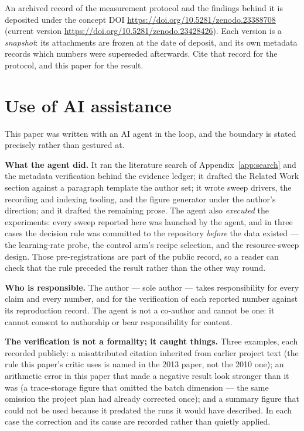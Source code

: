 \documentclass[11pt]{article}
\begin{document}
\begin{sloppypar}
An archived record of the measurement protocol and the findings behind it is
deposited under the concept DOI \url{https://doi.org/10.5281/zenodo.23388708}
(current version \url{https://doi.org/10.5281/zenodo.23428426}). Each version is
a \emph{snapshot}: its attachments are frozen at the date of deposit, and its
own metadata records which numbers were superseded afterwards. Cite that record
for the protocol, and this paper for the result.
\end{sloppypar}

\section*{Use of AI assistance}
This paper was written with an AI agent in the loop, and the boundary is stated
precisely rather than gestured at.

\textbf{What the agent did.} It ran the literature search of
Appendix~\ref{app:search} and the metadata verification behind the evidence
ledger; it drafted the Related Work section against a paragraph template the
author set; it wrote sweep drivers, the recording and indexing tooling, and the
figure generator under the author's direction; and it drafted the remaining
prose. The agent also \emph{executed} the experiments: every sweep reported here
was launched by the agent, and in three cases the decision rule was committed to
the repository \emph{before} the data existed --- the learning-rate probe, the
control arm's recipe selection, and the resource-sweep design. Those
pre-registrations are part of the public record, so a reader can check that the
rule preceded the result rather than the other way round.

\textbf{Who is responsible.} The author --- sole author --- takes responsibility
for every claim and every number, and for the verification of each reported
number against its reproduction record. The agent is not a co-author and cannot
be one: it cannot consent to authorship or bear responsibility for content.

\textbf{The verification is not a formality; it caught things.} Three examples,
each recorded publicly: a misattributed citation inherited from earlier project
text (the rule this paper's critic uses is named in the 2013 paper, not the 2010
one); an arithmetic error in this paper that made a negative result look stronger
than it was (a trace-storage figure that omitted the batch dimension --- the same
omission the project plan had already corrected once); and a summary figure that
could not be used because it predated the runs it would have described. In each
case the correction and its cause are recorded rather than quietly applied.
\end{document}
